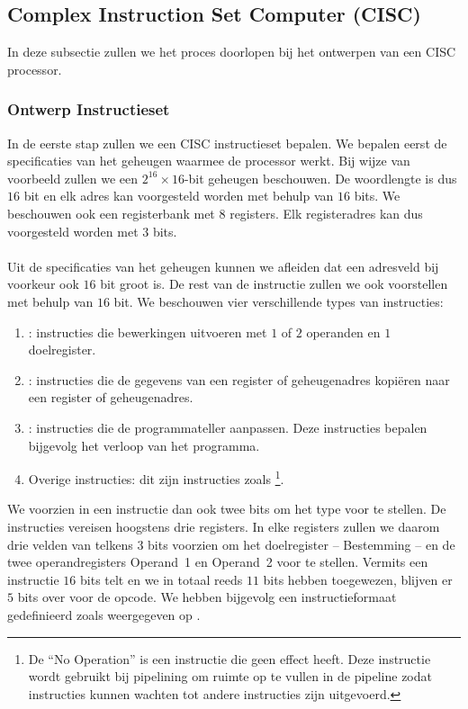 \subsection{Complex Instruction Set Computer (CISC)}
In deze subsectie zullen we het proces doorlopen bij het ontwerpen van een CISC processor.
\subsubsection{Ontwerp Instructieset}
In de eerste stap zullen we een CISC instructieset bepalen. We bepalen eerst de specificaties van het geheugen waarmee de processor werkt. Bij wijze van voorbeeld zullen we een $2^{16}\times 16$-bit geheugen beschouwen. De woordlengte is dus $16$ bit en elk adres kan voorgesteld worden met behulp van $16$ bits. We beschouwen ook een registerbank met $8$ registers. Elk registeradres kan dus voorgesteld worden met $3$ bits.
\paragraph{}
Uit de specificaties van het geheugen kunnen we afleiden dat een adresveld bij voorkeur ook $16$ bit groot is. De rest van de instructie zullen we ook voorstellen met behulp van $16$ bit. We beschouwen vier verschillende types van instructies:
\begin{enumerate}
 \item {}: instructies die bewerkingen uitvoeren met $1$ of $2$ operanden en $1$ doelregister.
 \item {}: instructies die de gegevens van een register of geheugenadres kopi\"eren naar een register of geheugenadres.
 \item {}: instructies die de programmateller aanpassen. Deze instructies bepalen bijgevolg het verloop van het programma.
 \item Overige instructies: dit zijn instructies zoals \footnote{De ``No Operation'' is een instructie die geen effect heeft. Deze instructie wordt gebruikt bij pipelining om ruimte op te vullen in de pipeline zodat instructies kunnen wachten tot andere instructies zijn uitgevoerd.}.
\end{enumerate}
We voorzien in een instructie dan ook twee bits om het type voor te stellen. De instructies vereisen hoogstens drie registers. In elke registers zullen we daarom drie velden van telkens $3$ bits voorzien om het doelregister -- \mbox{Bestemming} -- en de twee operandregisters \mbox{Operand 1} en \mbox{Operand 2} voor te stellen. Vermits een instructie $16$ bits telt en we in totaal reeds $11$ bits hebben toegewezen, blijven er $5$ bits over voor de opcode. We hebben bijgevolg een instructieformaat gedefinieerd zoals weergegeven op .
